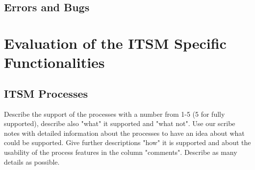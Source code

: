 \section{Errors and Bugs}


\chapter{Evaluation of the ITSM Specific Functionalities}

\section{ITSM Processes}
\label{sec:itsmprocesses}

Describe the support of the processes with a number from 1-5 (5 for fully supported), describe also "what" it supported and "what not". Use our scribe notes with detailed information about the processes to have an idea about what could be supported. Give further descriptions "how" it is supported and about the usability of the process features in the column "comments". Describe as many details as possible.

